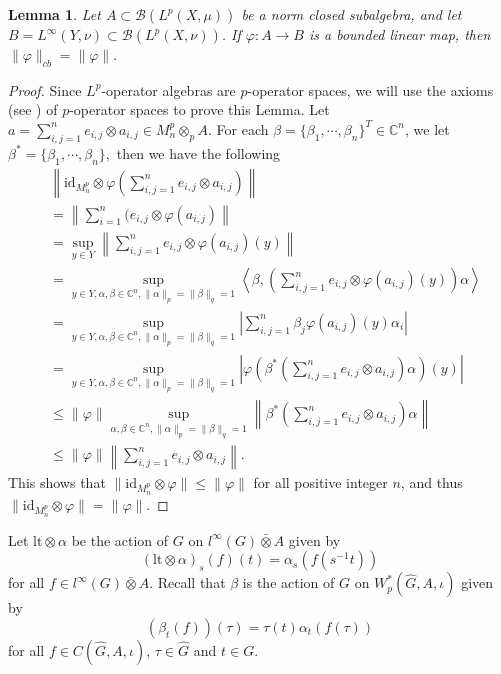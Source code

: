 \documentclass[reqno,11pt]{amsart}
\theoremstyle{plain}
\newtheorem{lem}[thm]{Lemma}
\theoremstyle{definition}
\theoremstyle{remark}
\newcommand{\la}{\langle}
\newcommand{\ra}{\rangle}
\begin{document}
\begin{lem}\label{cb}
Let $A\subset \mathcal{B}(L^p(X,\mu))$ be a norm closed subalgebra, and let $B=L^\infty(Y,\nu)\subset \mathcal{B}(L^p(X,\nu))$. If $\varphi:A\rightarrow B$ is a bounded linear map, then $\|\varphi\|_{cb}=\|\varphi\|.$
\end{lem}
\begin{proof}
Since $L^p$-operator algebras are $p$-operator spaces, we will use the axioms (see \cite[axiom $\mathcal{M}_p$]{Daws1}) of $p$-operator spaces  to prove this Lemma.
Let $a=\sum_{i,j=1}^n e_{i,j}\otimes a_{i,j}\in M_n^p\otimes_p A$.
For each $\beta=\{\beta_1,\cdots,\beta_n\}^{T}\in \mathbb{C}^n$, we let $\beta^*=\{\beta_1,\cdots,\beta_n\},$ then we have the following
$$\begin{aligned} &\left\|\mathrm{id}_{M_n^p}\otimes \varphi(\sum_{i,j=1}^n e_{i,j}\otimes a_{i,j})\right\|
\\&=\left\|\sum_{i=1}^n(e_{i,j}\otimes \varphi(a_{i,j})\right\|
  \\ &=\sup_{y\in Y}\left\|\sum_{i,j=1}^n e_{i,j}\otimes \varphi(a_{i,j})(y)\right\|
\\&=\sup_{y\in Y,\alpha,\beta\in \mathbb{C}^n, \|\alpha\|_p=\|\beta\|_q=1}\left\la\beta,\left(\sum_{i,j=1}^n e_{i,j}\otimes \varphi(a_{i,j})(y)\right)\alpha\right\ra
\\&=\sup_{y\in Y,\alpha,\beta\in \mathbb{C}^n, \|\alpha\|_p=\|\beta\|_q=1}\left|\sum_{i,j=1}^n \beta_j\varphi(a_{i,j})(y)\alpha_i\right|
\\&=\sup_{y\in Y,\alpha,\beta\in \mathbb{C}^n, \|\alpha\|_p=\|\beta\|_q=1} \left|\varphi\left(\beta^*\left(\sum_{i,j=1}^ne_{i,j}\otimes a_{i,j}\right)\alpha\right)(y)\right|
\\&\leq \|\varphi\|\sup_{\alpha,\beta\in \mathbb{C}^n, \|\alpha\|_p=\|\beta\|_q=1} \left\|\beta^*\left(\sum_{i,j=1}^ne_{i,j}\otimes a_{i,j}\right)\alpha\right\|
\\&\leq \|\varphi\|\left\|\sum_{i,j=1}^ne_{i,j}\otimes a_{i,j}\right\|.
\end{aligned}$$
This shows that $\|\mathrm{id}_{M_n^p}\otimes \varphi\|\leq \|\varphi\|$ for all positive integer $n$, and thus $\|\mathrm{id}_{M_n^p}\otimes \varphi\|= \|\varphi\|$.
\end{proof}



Let $\mathrm{lt}\otimes\alpha$ be the action of $G$ on $l^\infty(G)\bar{\otimes}A$ given by $$(\mathrm{lt}\otimes\alpha)_s(f)(t)=\alpha_s(f(s^{-1}t))$$ for all $f\in l^\infty(G)\bar{\otimes}A$.
Recall that $\beta$ is the action of $G$ on $W^*_p(\hat{G},A,\iota)$ given by $$\left(\beta_t(f)\right)(\tau)=\tau(t)\alpha_t\left(f(\tau)\right)$$ for all $f\in C(\hat{G},A,\iota)$, $\tau\in\hat{G}$ and $t\in G$.
\end{document}
